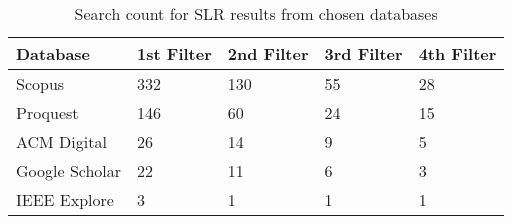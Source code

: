 
\begin{table}[h!]
    \begin{center}
        \caption{Search count for SLR results from chosen databases}
        \label{tab:SLR_Count}
        \begin{tabular}{l|l|l|l|l} %
            \textbf{Database} & \textbf{1st Filter} & \textbf{2nd Filter} & \textbf{3rd Filter} & \textbf{4th Filter} \\
            \hline
            Scopus            & 332                 & 130                 & 55                  & 28                  \\
            \hline
            Proquest          & 146                 & 60                  & 24                  & 15                  \\
            \hline
            ACM Digital       & 26                  & 14                  & 9                   & 5                   \\
            \hline
            Google Scholar    & 22                  & 11                  & 6                   & 3                   \\
            \hline
            IEEE Explore      & 3                   & 1                   & 1                   & 1                   \\
        \end{tabular}
    \end{center}
\end{table}

